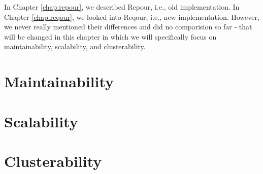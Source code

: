 \documentclass[../main.tex]{subfiles}
\begin{document}
In Chapter \ref{chap:repour}, we described Repour, i.e., old implementation. In Chapter \ref{chap:reqour}, we looked into Reqour, i.e., new implementation. However, we never really mentioned their differences and did no comparision so far ‐ that will be changed in this chapter in which we will specifically focus on maintainability, scalability, and clusterability.

\section{Maintainability}


\section{Scalability}


\section{Clusterability}

\end{document}
